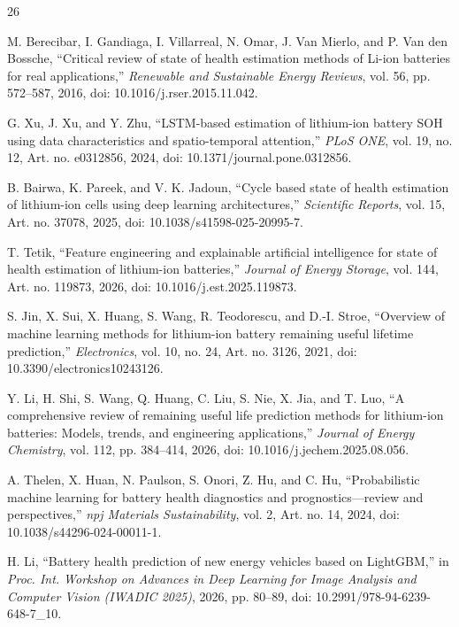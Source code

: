 \documentclass[conference]{IEEEtran}
\begin{document}
\balance
\begin{thebibliography}{26}

 M. Berecibar, I. Gandiaga, I. Villarreal, N. Omar, J. Van Mierlo, and P. Van den Bossche, ``Critical review of state of health estimation methods of Li-ion batteries for real applications,'' \emph{Renewable and Sustainable Energy Reviews}, vol. 56, pp. 572--587, 2016, doi: 10.1016/j.rser.2015.11.042.

 G. Xu, J. Xu, and Y. Zhu, ``LSTM-based estimation of lithium-ion battery SOH using data characteristics and spatio-temporal attention,'' \emph{PLoS ONE}, vol. 19, no. 12, Art. no. e0312856, 2024, doi: 10.1371/journal.pone.0312856.

 B. Bairwa, K. Pareek, and V. K. Jadoun, ``Cycle based state of health estimation of lithium-ion cells using deep learning architectures,'' \emph{Scientific Reports}, vol. 15, Art. no. 37078, 2025, doi: 10.1038/s41598-025-20995-7.

 T. Tetik, ``Feature engineering and explainable artificial intelligence for state of health estimation of lithium-ion batteries,'' \emph{Journal of Energy Storage}, vol. 144, Art. no. 119873, 2026, doi: 10.1016/j.est.2025.119873.

 S. Jin, X. Sui, X. Huang, S. Wang, R. Teodorescu, and D.-I. Stroe, ``Overview of machine learning methods for lithium-ion battery remaining useful lifetime prediction,'' \emph{Electronics}, vol. 10, no. 24, Art. no. 3126, 2021, doi: 10.3390/electronics10243126.

 Y. Li, H. Shi, S. Wang, Q. Huang, C. Liu, S. Nie, X. Jia, and T. Luo, ``A comprehensive review of remaining useful life prediction methods for lithium-ion batteries: Models, trends, and engineering applications,'' \emph{Journal of Energy Chemistry}, vol. 112, pp. 384--414, 2026, doi: 10.1016/j.jechem.2025.08.056.

 A. Thelen, X. Huan, N. Paulson, S. Onori, Z. Hu, and C. Hu, ``Probabilistic machine learning for battery health diagnostics and prognostics---review and perspectives,'' \emph{npj Materials Sustainability}, vol. 2, Art. no. 14, 2024, doi: 10.1038/s44296-024-00011-1.

 H. Li, ``Battery health prediction of new energy vehicles based on LightGBM,'' in \emph{Proc. Int. Workshop on Advances in Deep Learning for Image Analysis and Computer Vision (IWADIC 2025)}, 2026, pp. 80--89, doi: 10.2991/978-94-6239-648-7\_10.


\end{thebibliography}
\end{document}
